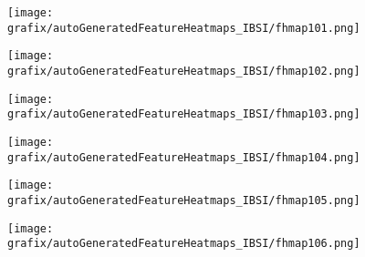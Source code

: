 \begin{subfigure}{\wid\textwidth} 
    \centering 
    \caption{\small \sffamily {}} 
\end{subfigure} 
\hspace{\hsp} 
\begin{subfigure}{\wid\textwidth} 
    \centering 
    \caption{\tiny \sffamily {}} 
    \vspace{\vsp} 
    \texttt{[image: grafix/autoGeneratedFeatureHeatmaps\_IBSI/fhmap101.png]} 
\end{subfigure} 
\hspace{\hsp} 
\begin{subfigure}{\wid\textwidth} 
    \centering 
    \caption{\tiny \sffamily {}} 
    \vspace{\vsp} 
    \texttt{[image: grafix/autoGeneratedFeatureHeatmaps\_IBSI/fhmap102.png]} 
\end{subfigure} 
\hspace{\hsp} 
\begin{subfigure}{\wid\textwidth} 
    \centering 
    \caption{\tiny \sffamily {}} 
    \vspace{\vsp} 
    \texttt{[image: grafix/autoGeneratedFeatureHeatmaps\_IBSI/fhmap103.png]} 
\end{subfigure} 
\hspace{\hsp} 
\begin{subfigure}{\wid\textwidth} 
    \centering 
    \caption{\tiny \sffamily {}} 
    \vspace{\vsp} 
    \texttt{[image: grafix/autoGeneratedFeatureHeatmaps\_IBSI/fhmap104.png]} 
\end{subfigure} 
\hspace{\hsp} 
\begin{subfigure}{\wid\textwidth} 
    \centering 
    \caption{\tiny \sffamily {}} 
    \vspace{\vsp} 
    \texttt{[image: grafix/autoGeneratedFeatureHeatmaps\_IBSI/fhmap105.png]} 
\end{subfigure} 
\hspace{\hsp} 
\begin{subfigure}{\wid\textwidth} 
    \centering 
    \caption{\tiny \sffamily {}} 
    \vspace{\vsp} 
    \texttt{[image: grafix/autoGeneratedFeatureHeatmaps\_IBSI/fhmap106.png]} 
\end{subfigure} 
